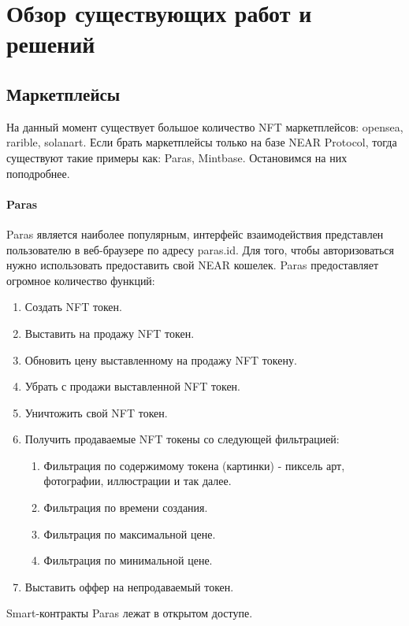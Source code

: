 \section{Обзор существующих работ и решений}
\label{section.theory}
\subsection{Маркетплейсы}
На данный момент существует большое количество NFT маркетплейсов: opensea\cite{opensea}, rarible\cite{rarible}, solanart\cite{solanart}. Если брать маркетплейсы только на базе NEAR Protocol, тогда существуют такие примеры как: Paras\cite{paras}, Mintbase\cite{mintbase}. Остановимся на них поподробнее.

\paragraph{Paras}
\label{section.theory.paras}

Paras является наиболее популярным, интерфейс взаимодействия представлен пользователю в веб-браузере по адресу paras.id. Для того, чтобы авторизоваться нужно использовать
предоставить свой NEAR кошелек. Paras предоставляет огромное количество функций:
\begin{enumerate}
    \item Создать NFT токен.
    \item Выставить на продажу NFT токен.
    \item Обновить цену выставленному на продажу NFT токену.
    \item Убрать с продажи выставленной NFT токен.
    \item Уничтожить свой NFT токен.
    \item Получить продаваемые NFT токены со следующей фильтрацией:
        \begin{enumerate}
            \item Фильтрация по содержимому токена (картинки) - пиксель арт, фотографии, иллюстрации и так далее.
            \item Фильтрация по времени создания.
            \item Фильтрация по максимальной цене.
            \item Фильтрация по минимальной цене.
        \end{enumerate}
    \item Выставить оффер на непродаваемый токен.
\end{enumerate}

Smart-контракты Paras лежат в открытом доступе\cite{parasnftcontract, parasmarketplacecontract}.

